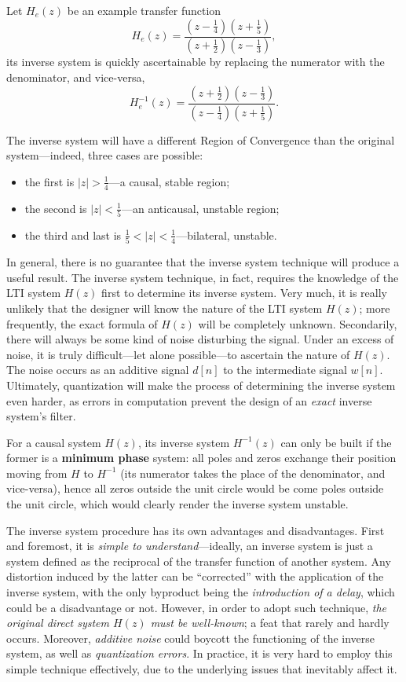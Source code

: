 \documentclass[\documentfontsize, twocolumn]{\classname}
\begin{document}
Let $H_e(z)$ be an example transfer function
\[
    H_e(z) = \frac{
        (z - \frac 1 4)(z + \frac 1 5)
    } {
        (z + \frac 1 2)(z - \frac 1 3)
    },
\]
its inverse system is quickly ascertainable by replacing the numerator with the denominator, and vice-versa,
\[
    H_e^{-1}(z) = \frac{
        (z + \frac 1 2)(z - \frac 1 3)
    } {
        (z - \frac 1 4)(z + \frac 1 5)
    }.
\]

The inverse system will have a different Region of Convergence than the original system---indeed, three cases are possible:
\begin{itemize}
    \item the first is $|z| > \frac 1 4$---a causal, stable region;
    \item the second is $|z| < \frac 1 5$---an anticausal, unstable region;
    \item the third and last is $\frac 1 5 < |z| < \frac 1 4$---bilateral, unstable.
\end{itemize}

In general, there is no guarantee that the inverse system technique will produce a useful result. The inverse system technique, in fact, requires the knowledge of the LTI system $H(z)$ first to determine its inverse system. Very much, it is really unlikely that the designer will know the nature of the LTI system $H(z)$; more frequently, the exact formula of $H(z)$ will be completely unknown. Secondarily, there will always be some kind of noise disturbing the signal. Under an excess of noise, it is truly difficult---let alone possible---to ascertain the nature of $H(z)$. The noise occurs as an additive signal $d[n]$ to the intermediate signal $w[n]$. Ultimately, quantization will make the process of determining the inverse system even harder, as errors in computation prevent the design of an \emph{exact} inverse system's filter.

For a causal system $H(z)$, its inverse system $H^{-1}(z)$ can only be built if the former is a \textbf{minimum phase} system: all poles and zeros exchange their position moving from $H$ to $H^{-1}$ (its numerator takes the place of the denominator, and vice-versa), hence all zeros outside the unit circle would be come poles outside the unit circle, which would clearly render the inverse system unstable.

The inverse system procedure has its own advantages and disadvantages. First and foremost, it is \emph{simple to understand}---ideally, an inverse system is just a system defined as the reciprocal of the transfer function of another system. Any distortion induced by the latter can be ``corrected'' with the application of the inverse system, with the only byproduct being the \emph{introduction of a delay}, which could be a disadvantage or not. However, in order to adopt such technique, \emph{the original direct system $H(z)$ must be well-known}; a feat that rarely and hardly occurs. Moreover, \emph{additive noise} could boycott the functioning of the inverse system, as well as \emph{quantization errors}. In practice, it is very hard to employ this simple technique effectively, due to the underlying issues that inevitably affect it.
\end{document}
